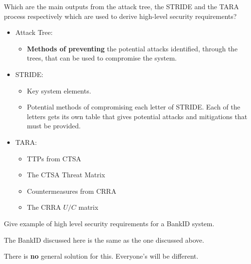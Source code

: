 \begin{questions}
\question{} Which are the main outputs from the attack tree, the STRIDE and the TARA process respectively which are used to derive high-level security requirements?
  \begin{solution}
    \begin{itemize}[noitemsep]
    \item Attack Tree:
      \begin{itemize}[noitemsep]
      \item \textbf{Methods of preventing} the potential attacks identified, through the trees, that can be used to compromise the system.
      \end{itemize}
    \item STRIDE:\@
      \begin{itemize}[noitemsep]
      \item Key system elements.
      \item Potential methods of compromising each letter of STRIDE.\@
        Each of the letters gets its own table that gives potential attacks and mitigations that must be provided.
      \end{itemize}
    \item TARA:\@
      \begin{itemize}[noitemsep]
      \item TTPs from CTSA
      \item The CTSA Threat Matrix
      \item Countermeasures from CRRA
      \item The CRRA $U/C$ matrix
      \end{itemize}
    \end{itemize}
  \end{solution}

\question{} Give example of high level security requirements for a BankID system.
  \begin{solution}
    The BankID discussed here is the same as the one discussed above.

    There is \textbf{no} general solution for this.
    Everyone's will be different.
  \end{solution}

\end{questions}

